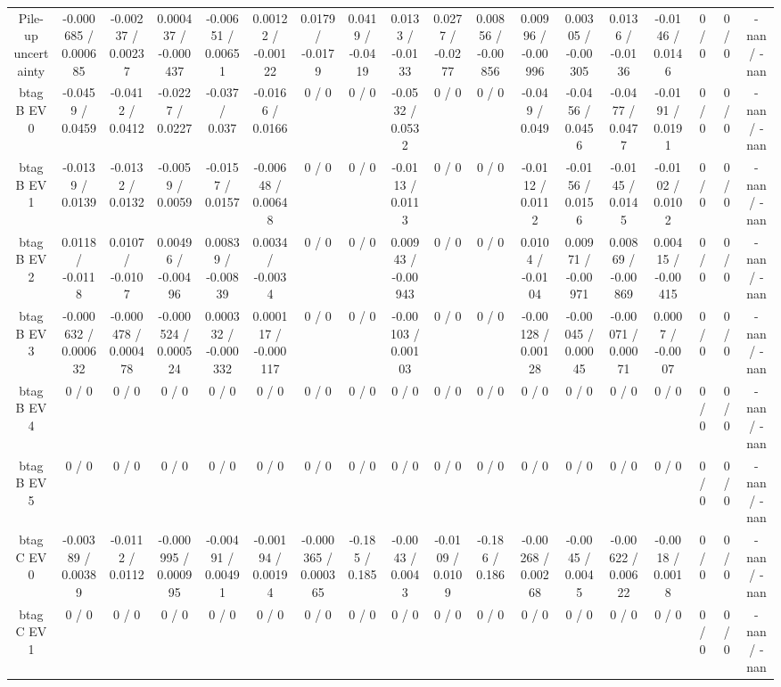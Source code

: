 \documentclass[10pt]{article}
\begin{document}
\begin{table}[htbp]
\begin{center}
\begin{tabular}{|c|c|c|c|c|c|c|c|c|c|c|c|c|c|c|c|c|c|}
  Pile-up uncertainty & -0.000685 / 0.000685 & -0.00237 / 0.00237 & 0.000437 / -0.000437 & -0.00651 / 0.00651 & 0.00122 / -0.00122 & 0.0179 / -0.0179 & 0.0419 / -0.0419 & 0.0133 / -0.0133 & 0.0277 / -0.0277 & 0.00856 / -0.00856 & 0.00996 / -0.00996 & 0.00305 / -0.00305 & 0.0136 / -0.0136 & -0.0146 / 0.0146 & 0 / 0 & 0 / 0 & -nan / -nan \\ 
  btag B EV 0 & -0.0459 / 0.0459 & -0.0412 / 0.0412 & -0.0227 / 0.0227 & -0.037 / 0.037 & -0.0166 / 0.0166 & 0 / 0 & 0 / 0 & -0.0532 / 0.0532 & 0 / 0 & 0 / 0 & -0.049 / 0.049 & -0.0456 / 0.0456 & -0.0477 / 0.0477 & -0.0191 / 0.0191 & 0 / 0 & 0 / 0 & -nan / -nan \\ 
  btag B EV 1 & -0.0139 / 0.0139 & -0.0132 / 0.0132 & -0.0059 / 0.0059 & -0.0157 / 0.0157 & -0.00648 / 0.00648 & 0 / 0 & 0 / 0 & -0.0113 / 0.0113 & 0 / 0 & 0 / 0 & -0.0112 / 0.0112 & -0.0156 / 0.0156 & -0.0145 / 0.0145 & -0.0102 / 0.0102 & 0 / 0 & 0 / 0 & -nan / -nan \\ 
  btag B EV 2 & 0.0118 / -0.0118 & 0.0107 / -0.0107 & 0.00496 / -0.00496 & 0.00839 / -0.00839 & 0.0034 / -0.0034 & 0 / 0 & 0 / 0 & 0.00943 / -0.00943 & 0 / 0 & 0 / 0 & 0.0104 / -0.0104 & 0.00971 / -0.00971 & 0.00869 / -0.00869 & 0.00415 / -0.00415 & 0 / 0 & 0 / 0 & -nan / -nan \\ 
  btag B EV 3 & -0.000632 / 0.000632 & -0.000478 / 0.000478 & -0.000524 / 0.000524 & 0.000332 / -0.000332 & 0.000117 / -0.000117 & 0 / 0 & 0 / 0 & -0.00103 / 0.00103 & 0 / 0 & 0 / 0 & -0.00128 / 0.00128 & -0.00045 / 0.00045 & -0.00071 / 0.00071 & 0.0007 / -0.0007 & 0 / 0 & 0 / 0 & -nan / -nan \\ 
  btag B EV 4 & 0 / 0 & 0 / 0 & 0 / 0 & 0 / 0 & 0 / 0 & 0 / 0 & 0 / 0 & 0 / 0 & 0 / 0 & 0 / 0 & 0 / 0 & 0 / 0 & 0 / 0 & 0 / 0 & 0 / 0 & 0 / 0 & -nan / -nan \\ 
  btag B EV 5 & 0 / 0 & 0 / 0 & 0 / 0 & 0 / 0 & 0 / 0 & 0 / 0 & 0 / 0 & 0 / 0 & 0 / 0 & 0 / 0 & 0 / 0 & 0 / 0 & 0 / 0 & 0 / 0 & 0 / 0 & 0 / 0 & -nan / -nan \\ 
  btag C EV 0 & -0.00389 / 0.00389 & -0.0112 / 0.0112 & -0.000995 / 0.000995 & -0.00491 / 0.00491 & -0.00194 / 0.00194 & -0.000365 / 0.000365 & -0.185 / 0.185 & -0.0043 / 0.0043 & -0.0109 / 0.0109 & -0.186 / 0.186 & -0.00268 / 0.00268 & -0.0045 / 0.0045 & -0.00622 / 0.00622 & -0.0018 / 0.0018 & 0 / 0 & 0 / 0 & -nan / -nan \\ 
  btag C EV 1 & 0 / 0 & 0 / 0 & 0 / 0 & 0 / 0 & 0 / 0 & 0 / 0 & 0 / 0 & 0 / 0 & 0 / 0 & 0 / 0 & 0 / 0 & 0 / 0 & 0 / 0 & 0 / 0 & 0 / 0 & 0 / 0 & -nan / -nan \\ 

\end{tabular}
\end{center}
\end{table}
\end{document}
